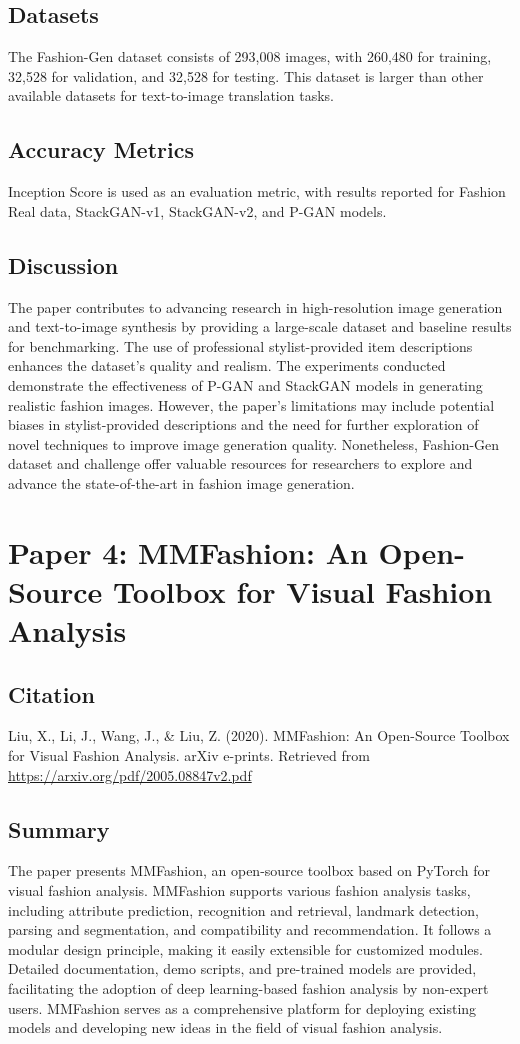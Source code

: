 \documentclass{article}
\begin{document}
\subsection*{Datasets}
The Fashion-Gen dataset consists of 293,008 images, with 260,480 for training, 32,528 for validation, and 32,528 for testing. This dataset is larger than other available datasets for text-to-image translation tasks.

\subsection*{Accuracy Metrics}
Inception Score is used as an evaluation metric, with results reported for Fashion Real data, StackGAN-v1, StackGAN-v2, and P-GAN models.

\subsection*{Discussion}
The paper contributes to advancing research in high-resolution image generation and text-to-image synthesis by providing a large-scale dataset and baseline results for benchmarking. The use of professional stylist-provided item descriptions enhances the dataset's quality and realism. The experiments conducted demonstrate the effectiveness of P-GAN and StackGAN models in generating realistic fashion images. However, the paper's limitations may include potential biases in stylist-provided descriptions and the need for further exploration of novel techniques to improve image generation quality. Nonetheless, Fashion-Gen dataset and challenge offer valuable resources for researchers to explore and advance the state-of-the-art in fashion image generation.
\section*{Paper 4: MMFashion: An Open-Source Toolbox for Visual Fashion Analysis}

\subsection*{Citation}
Liu, X., Li, J., Wang, J., \& Liu, Z. (2020). MMFashion: An Open-Source Toolbox for Visual Fashion Analysis. arXiv e-prints. Retrieved from \href{https://arxiv.org/pdf/2005.08847v2.pdf}{https://arxiv.org/pdf/2005.08847v2.pdf}

\subsection*{Summary}
The paper presents MMFashion, an open-source toolbox based on PyTorch for visual fashion analysis. MMFashion supports various fashion analysis tasks, including attribute prediction, recognition and retrieval, landmark detection, parsing and segmentation, and compatibility and recommendation. It follows a modular design principle, making it easily extensible for customized modules. Detailed documentation, demo scripts, and pre-trained models are provided, facilitating the adoption of deep learning-based fashion analysis by non-expert users. MMFashion serves as a comprehensive platform for deploying existing models and developing new ideas in the field of visual fashion analysis.
\end{document}
